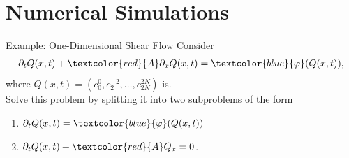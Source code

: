 \section{Numerical Simulations}
\begin{frame}{Example: One-Dimensional Shear Flow}
	\scriptsize
Consider
	\begin{align}
		\partial_t Q(x,t) + \textcolor{red}{A}\partial_x Q(x,t) = \textcolor{blue}{\varphi} (Q(x,t)), \label{conservationlaws}
	\end{align}
	where $Q(x,t) = (c^0_0, c^{-2}_2, \ldots, c^{2N}_{2N})$ is. \\
	\vspace{0.5cm}
	Solve this problem by splitting it into two subproblems of the form
	\begin{enumerate}
		\item $\partial_t Q(x,t)  = \textcolor{blue}{\varphi} (Q(x,t))$
		\item $\partial_t Q(x,t) + \textcolor{red}{A} Q_x=0$.
	\end{enumerate}
\end{frame}

